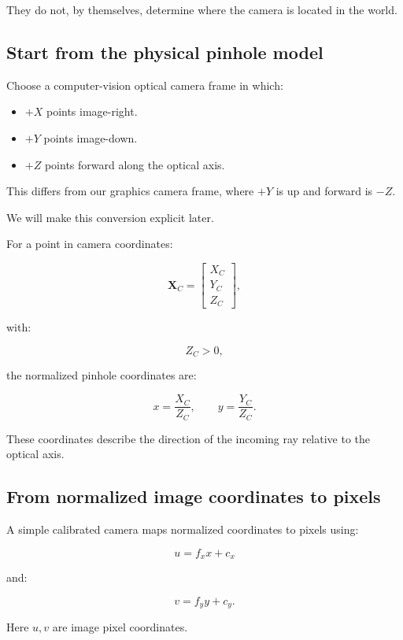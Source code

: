 They do not, by themselves, determine where the camera is located in the world.

\subsection{Start from the physical pinhole model}\label{02-foundations-ii-ch034-start-from-the-physical-pinhole-model}

Choose a computer-vision optical camera frame in which:

\begin{itemize}
\tightlist
\item
  \(+X\) points image-right.
\item
  \(+Y\) points image-down.
\item
  \(+Z\) points forward along the optical axis.
\end{itemize}

This differs from our graphics camera frame, where \(+Y\) is up and forward is \(-Z\).

We will make this conversion explicit later.

For a point in camera coordinates:

\[
 \mathbf X_C= \begin{bmatrix} X_C\\Y_C\\Z_C \end{bmatrix},
\]

with:

\[
 Z_C>0,
\]

the normalized pinhole coordinates are:

\[
 \boxed{ x=\frac{X_C}{Z_C}, \qquad y=\frac{Y_C}{Z_C} }.
\]

These coordinates describe the direction of the incoming ray relative to the optical axis.

\subsection{From normalized image coordinates to pixels}\label{02-foundations-ii-ch034-from-normalized-image-coordinates-to-pixels}

A simple calibrated camera maps normalized coordinates to pixels using:

\[
 \boxed{ u=f_xx+c_x }
\]

and:

\[
 \boxed{ v=f_yy+c_y }.
\]

Here \(u,v\) are image pixel coordinates.

